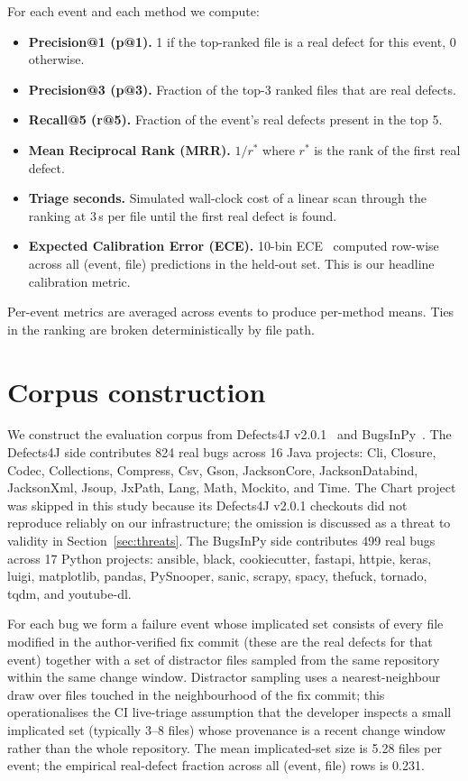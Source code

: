 \documentclass[preprint,12pt]{elsarticle}
\begin{document}
For each event and each method we compute:
\begin{itemize}
\item \textbf{Precision@1 (p@1).} 1 if the top-ranked file is a real defect for this event, 0 otherwise.
\item \textbf{Precision@3 (p@3).} Fraction of the top-3 ranked files that are real defects.
\item \textbf{Recall@5 (r@5).} Fraction of the event's real defects present in the top 5.
\item \textbf{Mean Reciprocal Rank (MRR).} $1 / r^*$ where $r^*$ is the rank of the first real defect.
\item \textbf{Triage seconds.} Simulated wall-clock cost of a linear scan through the ranking at 3\,s per file until the first real defect is found.
\item \textbf{Expected Calibration Error (ECE).} 10-bin ECE~\cite{guo2017calibration} computed row-wise across all (event, file) predictions in the held-out set. This is our headline calibration metric.
\end{itemize}
Per-event metrics are averaged across events to produce per-method means. Ties in the ranking are broken deterministically by file path.

\section{Corpus construction}
\label{sec:corpus}

We construct the evaluation corpus from Defects4J v2.0.1~\cite{just2014defects4j} and BugsInPy~\cite{widyasari2020bugsinpy}. The Defects4J side contributes 824 real bugs across 16 Java projects: Cli, Closure, Codec, Collections, Compress, Csv, Gson, JacksonCore, JacksonDatabind, JacksonXml, Jsoup, JxPath, Lang, Math, Mockito, and Time. The Chart project was skipped in this study because its Defects4J v2.0.1 checkouts did not reproduce reliably on our infrastructure; the omission is discussed as a threat to validity in Section~\ref{sec:threats}. The BugsInPy side contributes 499 real bugs across 17 Python projects: ansible, black, cookiecutter, fastapi, httpie, keras, luigi, matplotlib, pandas, PySnooper, sanic, scrapy, spacy, thefuck, tornado, tqdm, and youtube-dl.

For each bug we form a failure event whose implicated set consists of every file modified in the author-verified fix commit (these are the real defects for that event) together with a set of distractor files sampled from the same repository within the same change window. Distractor sampling uses a nearest-neighbour draw over files touched in the neighbourhood of the fix commit; this operationalises the CI live-triage assumption that the developer inspects a small implicated set (typically 3--8 files) whose provenance is a recent change window rather than the whole repository. The mean implicated-set size is 5.28 files per event; the empirical real-defect fraction across all (event, file) rows is 0.231.
\end{document}
